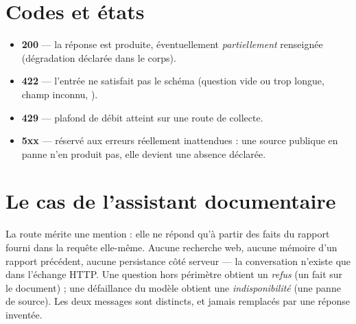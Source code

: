 \section{Codes et états}

\begin{itemize}
  \item \textbf{200} — la réponse est produite, éventuellement
    \emph{partiellement} renseignée (dégradation déclarée dans le corps).
  \item \textbf{422} — l'entrée ne satisfait pas le schéma (question vide ou trop
    longue, champ inconnu, ).
  \item \textbf{429} — plafond de débit atteint sur une route de collecte.
  \item \textbf{5xx} — réservé aux erreurs réellement inattendues : une source
    publique en panne n'en produit pas, elle devient une absence déclarée.
\end{itemize}

\section{Le cas de l'assistant documentaire}

La route  mérite une mention : elle ne répond qu'à
partir des faits du rapport fourni dans la requête elle-même. Aucune recherche
web, aucune mémoire d'un rapport précédent, aucune persistance côté serveur — la
conversation n'existe que dans l'échange HTTP. Une question hors périmètre
obtient un \emph{refus} (un fait sur le document) ; une défaillance du modèle
obtient une \emph{indisponibilité} (une panne de source). Les deux messages sont
distincts, et jamais remplacés par une réponse inventée.

